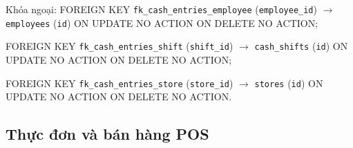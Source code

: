 \begin{description}[leftmargin=3.6cm,labelwidth=3.4cm,style=nextline]
Khóa ngoại: FOREIGN KEY \texttt{fk\_cash\_entries\_employee} (\texttt{employee\_id}) $\rightarrow$ \texttt{employees} (\texttt{id}) ON UPDATE NO ACTION ON DELETE NO ACTION;\par FOREIGN KEY \texttt{fk\_cash\_entries\_shift} (\texttt{shift\_id}) $\rightarrow$ \texttt{cash\_shifts} (\texttt{id}) ON UPDATE NO ACTION ON DELETE NO ACTION;\par FOREIGN KEY \texttt{fk\_cash\_entries\_store} (\texttt{store\_id}) $\rightarrow$ \texttt{stores} (\texttt{id}) ON UPDATE NO ACTION ON DELETE NO ACTION.

\end{description}

\subsection{Thực đơn và bán hàng POS}

